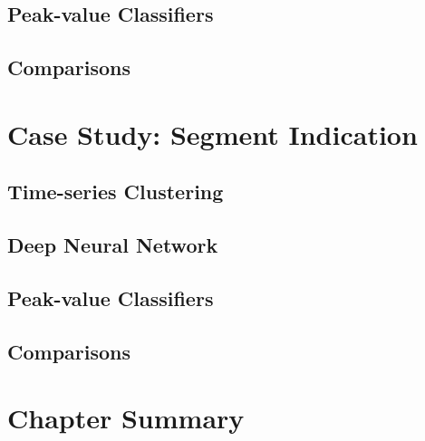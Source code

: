 \subsection{Peak-value Classifiers}


\subsection{Comparisons}

\newpage

\section{Case Study: Segment Indication}

\subsection{Time-series Clustering}



\subsection{Deep Neural Network}


\subsection{Peak-value Classifiers}


\subsection{Comparisons}

\section{Chapter Summary}
